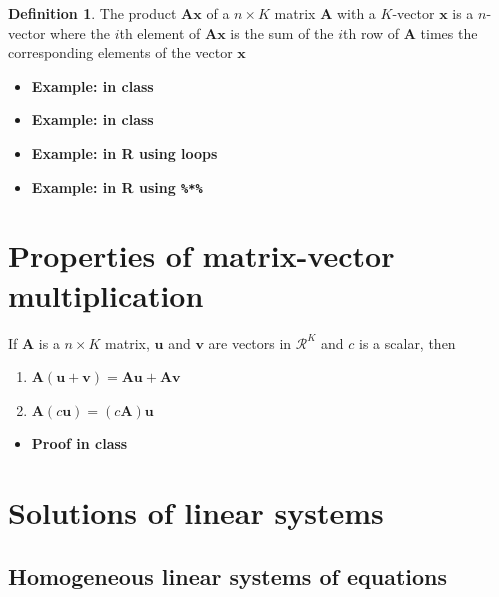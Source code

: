 \documentclass[
]{book}
\providecommand{\tightlist}{%
  \setlength{\itemsep}{0pt}\setlength{\parskip}{0pt}}
\theoremstyle{definition}
\newtheorem{definition}{Definition}[chapter]
\theoremstyle{definition}
\theoremstyle{definition}
\theoremstyle{definition}
\theoremstyle{remark}
\begin{document}
\begin{definition}
The product \(\mathbf{A}\mathbf{x}\) of a \(n \times K\) matrix \(\mathbf{A}\) with a \(K\)-vector \(\mathbf{x}\) is a \(n\)-vector where the \(i\)th element of \(\mathbf{A}\mathbf{x}\) is the sum of the \(i\)th row of \(\mathbf{A}\) times the corresponding elements of the vector \(\mathbf{x}\)
\end{definition}

\begin{itemize}
\item
  \textbf{Example: in class}
\item
  \textbf{Example: in class}
\item
  \textbf{Example: in R using loops}
\item
  \textbf{Example: in R using \texttt{\%*\%}}
\end{itemize}

\hypertarget{properties-of-matrix-vector-multiplication}{%
\section{Properties of matrix-vector multiplication}\label{properties-of-matrix-vector-multiplication}}

If \(\mathbf{A}\) is a \(n \times K\) matrix, \(\mathbf{u}\) and \(\mathbf{v}\) are vectors in \(\mathcal{R}^K\) and \(c\) is a scalar, then

\begin{enumerate}
\def\labelenumi{\alph{enumi})}
\tightlist
\item
  \(\mathbf{A} (\mathbf{u} + \mathbf{v}) = \mathbf{A} \mathbf{u} + \mathbf{A} \mathbf{v}\)
\item
  \(\mathbf{A} (c \mathbf{u}) = (c \mathbf{A}) \mathbf{u}\)
\end{enumerate}

\begin{itemize}
\tightlist
\item
  \textbf{Proof in class}
\end{itemize}

\hypertarget{solutions-of-linear-systems-1}{%
\section{Solutions of linear systems}\label{solutions-of-linear-systems-1}}

\hypertarget{homogeneous-linear-systems-of-equations}{%
\subsection{Homogeneous linear systems of equations}\label{homogeneous-linear-systems-of-equations}}
\end{document}
